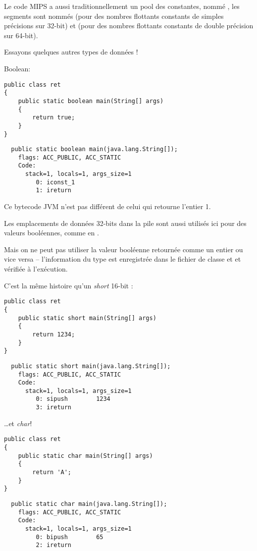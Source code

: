 Le code MIPS a aussi traditionnellement un pool des constantes, nommé , les segments
sont nommés  (pour des nombres flottants constants de simples précisions sur 32-bit) et 
(pour des nombres flottants constants de double précision sur 64-bit).

Essayons quelques autres types de données !

Boolean:

\begin{lstlisting}[style=customjava]
public class ret
{
	public static boolean main(String[] args)
	{
		return true;
	}
}
\end{lstlisting}

\begin{lstlisting}
  public static boolean main(java.lang.String[]);
    flags: ACC_PUBLIC, ACC_STATIC
    Code:
      stack=1, locals=1, args_size=1
         0: iconst_1
         1: ireturn
\end{lstlisting}

Ce bytecode JVM n'est pas différent de celui qui retourne l'entier 1.

Les emplacements de données 32-bits dans la pile sont aussi utilisés ici pour des valeurs booléennes, comme en \CCpp.

Mais on ne peut pas utiliser la valeur booléenne retournée comme un entier ou vice versa -- l'information du type est enregistrée dans le fichier de classe et et vérifiée à l'exécution.

C'est la même histoire qu'un \emph{short} 16-bit :

\begin{lstlisting}[style=customjava]
public class ret
{
	public static short main(String[] args)
	{
		return 1234;
	}
}
\end{lstlisting}

\begin{lstlisting}
  public static short main(java.lang.String[]);
    flags: ACC_PUBLIC, ACC_STATIC
    Code:
      stack=1, locals=1, args_size=1
         0: sipush        1234
         3: ireturn
\end{lstlisting}

\dots et \emph{char}!

\begin{lstlisting}[style=customjava]
public class ret
{
	public static char main(String[] args)
	{
		return 'A';
	}
}
\end{lstlisting}

\begin{lstlisting}
  public static char main(java.lang.String[]);
    flags: ACC_PUBLIC, ACC_STATIC
    Code:
      stack=1, locals=1, args_size=1
         0: bipush        65
         2: ireturn
\end{lstlisting}

